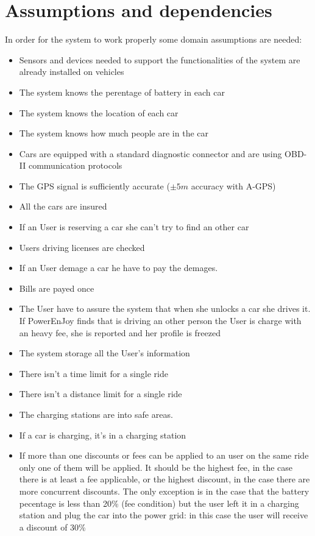 \section{Assumptions and dependencies}
In order for the system to work properly some domain assumptions are needed:%
\begin{itemize}
	\item{Sensors and devices needed to support the functionalities of the system are already installed on vehicles}
	\item{The system knows the perentage of battery in each car}
	\item{The system knows the location of each car}
	\item{The system knows how much people are in the car}
	\item{Cars are equipped with a standard diagnostic connector and are using OBD-II communication protocols}
	\item{The GPS signal is sufficiently accurate ($\pm5m$ accuracy with A-GPS)}
	\item{All the cars are insured}
	\item{If an User is reserving a car she can't try to find an other car}
	\item{Users driving licenses are checked}
	\item{If an User demage a car he have to pay the demages.}
	\item{Bills are payed once}
	\item {The User have to assure the system that when she unlocks a car she drives it. If PowerEnJoy finds that is driving an other person the User is charge with an heavy fee, she is reported and her profile is freezed}
	\item{The system storage all the User's information}
	\item{There isn't a time limit for a single ride}%
	\item{There isn't a distance limit for a single ride}%
	\item {The charging stations are into safe areas.}
	\item {If a car is charging, it's in a \gls{charging station}}
	\item{If more than one discounts or fees can be applied to an user on the same ride only one of them will be applied. It should be the highest fee, in the case there is at least a fee applicable, or the highest discount, in the case there are more concurrent discounts. The only exception is in the case that the battery pecentage is less than 20\% (fee condition) but the user left it in a \gls{charging station} and plug the car into the power grid: in this case the user will receive a discount of 30\%}

\end{itemize}
